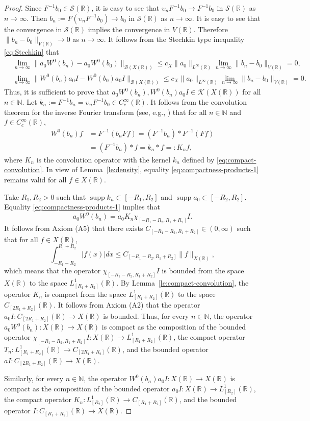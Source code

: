 \documentclass[reqno]{amsproc}
\newcommand{\cB}{\mathcal{B}}
\newcommand{\N}{\mathbb{N}}
\newcommand{\R}{\mathbb{R}}
\theoremstyle{definition}
\theoremstyle{remark}
\numberwithin{equation}{section}
\begin{document}
\begin{proof}
Since $F^{-1}b_0 \in \mathcal{S}(\mathbb{R})$, it is easy to see that 
$\upsilon_n F^{-1}b_0 \to F^{-1}b_0$ in $\mathcal{S}(\mathbb{R})$ as
$n \to \infty$. Then $b_n := F\left(\upsilon_n F^{-1}b_0\right) \to b_0$ 
in $\mathcal{S}(\mathbb{R})$ as $n\to\infty$. It is easy to see that the 
convergence in $\mathcal{S}(\R)$ implies the convergence in $V(\R)$.
Therefore $\|b_n - b_0\|_{V(\mathbb{R})} \to 0$ as $n \to \infty$. 
It follows from the Stechkin type inequality \eqref{eq:Stechkin} that
\begin{align*}
&
\lim_{n\to\infty}\|a_0W^0(b_n)-a_0W^0(b_0)\|_{\cB(X(\R))}
\le 
c_X\|a_0\|_{L^\infty(\R)}\lim_{n\to\infty}\|b_n-b_0\|_{V(\R)}
=0,
\\
&
\lim_{n\to\infty}\|W^0(b_n)a_0I-W^0(b_0)a_0I\|_{\cB(X(\R))}
\le 
c_X\|a_0\|_{L^\infty(\R)}\lim_{n\to\infty}\|b_n-b_0\|_{V(\R)}
=0.
\end{align*}
Thus, it is sufficient to prove that
$a_0W^0(b_n), W^0(b_n)a_0I \in \mathcal{K}(X(\mathbb{R}))$ for all $n\in\N$. 
Let 
$k_n:=F^{-1}b_n=\upsilon_n F^{-1}b_0\in C_c^\infty(\R)$.
It follows from the convolution theorem for the inverse Fourier
transform (see, e.g., \cite[Proposition~2.2.11, statement (12)]{G14}) that
for all $n\in\N$ and $f\in C_c^\infty(\R)$,
\begin{align}\label{eq:compactness-products-1}
W^0(b_n)f
&=
F^{-1}(b_nFf)=(F^{-1}b_n)*F^{-1}(Ff)
\nonumber\\
&=
(F^{-1}b_n)*f=k_n*f=:K_nf,
\end{align}
where $K_n$ is the convolution operator with the kernel $k_n$ defined by
\eqref{eq:compact-convolution}.
In view of Lemma~\ref{le:density}, equality \eqref{eq:compactness-products-1}
remains valid for all $f\in X(\R)$. 

Take $R_1,R_2>0$ such that $\operatorname{supp}k_n\subset[-R_1,R_2]$
and $\operatorname{supp}a_0\subset[-R_2,R_2]$. Equality 
\eqref{eq:compactness-products-1} implies that
\[
a_0W^0(b_n)=a_0K_n\chi_{[-R_1-R_2,R_1+R_2]}I.
\]
It follows from Axiom (A5) that there exists 
$C_{[-R_1-R_2,R_1+R_2]}\in(0,\infty)$ such that for all $f\in X(\R)$,
\[
\int_{-R_1-R_2}^{R_1+R_2}|f(x)|dx
\le 
C_{[-R_1-R_2,R_1+R_2]} \|f\|_{X(\R)},
\]
which means that the operator $\chi_{[-R_1-R_2,R_1+R_2]}I$ is bounded
from the space $X(\R)$ to the space $L^1_{[R_1+R_2]}(\R)$.
By Lemma~\ref{le:compact-convolution}, the operator $K_n$ is compact
from the space $L^1_{[R_1+R_2]}(\R)$ to the space $C_{[2R_1+R_2]}(\R)$.
It follows from Axiom (A2) that the operator 
$a_0I: C_{[2R_1+R_2]}(\R)\to X(\R)$ is bounded. Thus, for every $n\in\N$,
the operator $a_0W^0(b_n):X(\R)\to X(\R)$ is compact as the composition
of the bounded operator $\chi_{[-R_1-R_2,R_1+R_2]}I:X(\R)\to 
L^1_{[R_1+R_2]}(\R)$, the compact operator $T_n:L_{[R_1+R_2]}^1(\R)\to
C_{[2R_1+R_2]}(\R)$, and the bounded operator $aI:C_{[2R_1+R_2]}(\R)\to
X(\R)$.

Similarly, for every $n\in\N$, the operator $W^0(b_n) a_0I:X(\R)\to X(\R)$
is compact as the composition of the bounded operator
$a_0I:X(\R)\to L_{[R_2]}^1(\R)$, the compact operator
$K_n:L_{[R_2]}^1(\R)\to C_{[R_1+R_2]}(\R)$, and the bounded
operator $I:C_{[R_1+R_2]}(\R)\to X(\R)$.
\end{proof}
\end{document}
